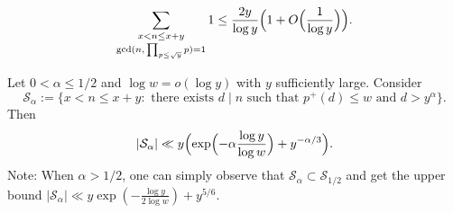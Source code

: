 \documentclass[10pt,a4paper]{amsart}
\begin{document}
\begin{equation} \label{sievebd}
\mathop{\sum_{x < n \le x + y}}_{\gcd(n, \, \prod_{p \le \sqrt{y}} p ) = 1} 1 \le \frac{2y}{\log y} \Bigl(1 + O \Bigl( \frac{1}{\log y} \Bigr) \Bigr).
\end{equation}

\begin{proposition} \label{P}
Let $0 < \alpha \le 1/2$ and $\log w = o(\log y)$ with $y$ sufficiently large. Consider
\[
\mathcal{S}_\alpha := \{ x < n \le x + y : \text{ there exists $d \mid n$ such that } p^+(d) \le w \text{ and } d > y^\alpha \}.
\]
Then
\[
| \mathcal{S}_\alpha | \ll y \Bigl( \exp \Bigl(- \alpha \frac{\log y}{\log w} \Bigr) + y^{-\alpha / 3} \Bigr).
\]
Note: When $\alpha > 1/2$, one can simply observe that $\mathcal{S}_\alpha \subset \mathcal{S}_{1/2}$ and get the upper bound $|\mathcal{S}_\alpha| \ll y \exp( -\frac{ \log y}{2 \log w} ) + y^{5/6}$.
\end{proposition}
\end{document}
